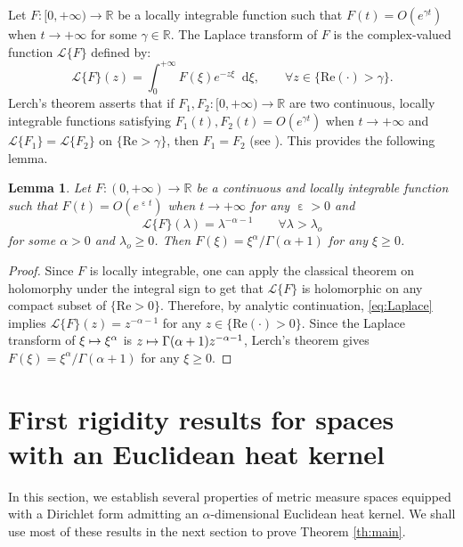 \documentclass[JEP,XML,SOM,Unicode,published]{cedram}
\newcommand\mto{\mathchoice{\longmapsto}{\mapsto}{\mapsto}{\mapsto}}
\theoremstyle{plain}
\newtheorem{lemma}[theorem]{Lemma}
\theoremstyle{definition}
\newcommand{\setR}{\mathbb{R}}
\let\eps\upepsilon
\newcommand{\di}{\mathop{}\!\mathrm{d}}
\begin{document}
Let $F:[0,+\infty)\to \setR$ be a locally integrable function such that $F(t)=O(e^{\gamma t})$ when $t \to +\infty$ for some $\gamma \in \setR$. The Laplace transform of $F$ is the complex-valued function $\mathcal{L}\{F\}$ defined by:
\[
\mathcal{L}\{F\}(z) = \int_0^{+\infty} F(\xi)e^{-z\xi}\di \xi, \qquad \forall z \in \{\mathrm{Re}(\cdot) > \gamma\}.
\]
Lerch's theorem asserts that if $F_1, F_2: [0,+\infty)\to\setR$ are two continuous, locally integrable functions satisfying $F_1(t), F_2(t)=O(e^{\gamma t})$ when $t \to +\infty$ and $\mathcal{L}\{F_1\} = \mathcal{L}\{F_2\}$ on $\{\mathrm{Re}>\gamma\}$, then $F_1=F_2$ (see \eg \cite[Th.\,2.1]{Cohen}). This provides the following lemma.

\begin{lemma}\label{lem:Laplace}
Let $F:(0,+\infty)\to \setR$ be a continuous and locally integrable function such that $F(t)=O(e^{\eps t})$ when $t \to +\infty$ for any $\eps>0$ and
\begin{equation}\label{eq:Laplace}
\mathcal{L}\{F\}(\lambda) = \lambda^{-\alpha-1} \qquad \forall \lambda >\lambda_o
\end{equation}
for some $\alpha>0$ and $\lambda_o \ge 0$. Then $F(\xi)=\xi^\alpha/\Gamma(\alpha+1)$ for any $\xi\ge0$.
\end{lemma}

\begin{proof}
Since $F$ is locally integrable, one can apply the classical theorem on holomorphy under the integral sign to get that $\mathcal{L}\{F\}$ is holomorphic on any compact subset of $\{\mathrm{Re}>0\}$. Therefore, by analytic continuation, \eqref{eq:Laplace} implies $\mathcal{L}\{F\}(z) = z^{-\alpha-1}$ for any $z \in \{ \mathrm{Re}(\cdot)>0\}$. Since the Laplace transform of $\xi \mto \xi^{\alpha}$ is $z\mto \Gamma(\alpha +1) z^{-\alpha-1}$, Lerch's theorem gives $F(\xi)=\xi^\alpha/\Gamma(\alpha+1)$ for any $\xi\ge0$.
\end{proof}

\section{First rigidity results for spaces with an Euclidean heat kernel}\label{sec:3}

In this section, we establish several properties of metric measure spaces equipped with a Dirichlet form admitting an $\alpha$-dimensional Euclidean heat kernel. We shall use most of these results in the next section to prove Theorem \ref{th:main}.
\end{document}
